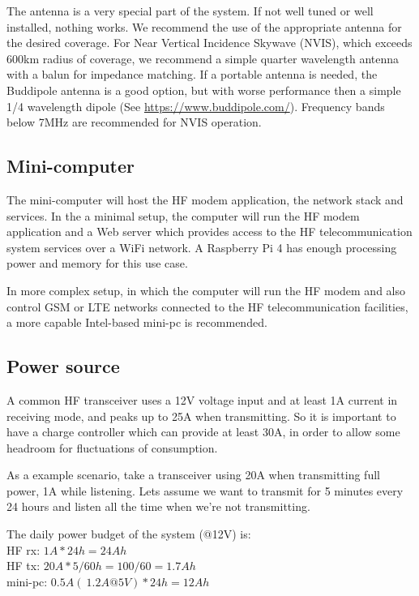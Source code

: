 \documentclass[11pt,a4paper]{article}
\begin{document}
The antenna is a very special part of the system. If not well tuned or well
installed, nothing works. We recommend the use of the appropriate antenna
for the desired coverage. For Near Vertical Incidence Skywave (NVIS), which
exceeds 600km radius of coverage, we recommend a simple quarter wavelength
antenna with a balun for impedance matching. If a portable antenna is
needed, the Buddipole antenna is a good option, but with worse performance
then a simple 1/4 wavelength dipole (See
\url{https://www.buddipole.com/}). Frequency bands below 7MHz are
recommended for NVIS operation.


\subsection{Mini-computer}

The mini-computer will host the HF modem application, the network
stack and services. In the a minimal setup, the computer will run the HF
modem application and a Web server which provides access to the HF
telecommunication system services over a WiFi network. A Raspberry Pi 4 has
enough processing power and memory for this use case.

In more complex setup, in which the computer will run the HF modem and also
control GSM or LTE networks connected to the HF telecommunication
facilities, a more capable Intel-based mini-pc is recommended.

\subsection{Power source}

A common HF transceiver uses a 12V voltage input and at least 1A current in
receiving mode, and peaks up to 25A when transmitting. So it is important
to have a charge controller which can provide at least 30A, in order to
allow some headroom for fluctuations of consumption.

As a example scenario, take a transceiver using 20A when transmitting full
power, 1A while listening. Lets assume we want to transmit for 5 minutes
every 24 hours and listen all the time when we're not transmitting.

The daily power budget of the system (@12V) is:\\
HF rx: $1A * 24h = 24Ah$ \\
HF tx: $20A * 5/60h = 100/60 = 1.7Ah$\\
mini-pc: $0.5A (~ 1.2A@5V) * 24h = 12Ah$\\
\end{document}
